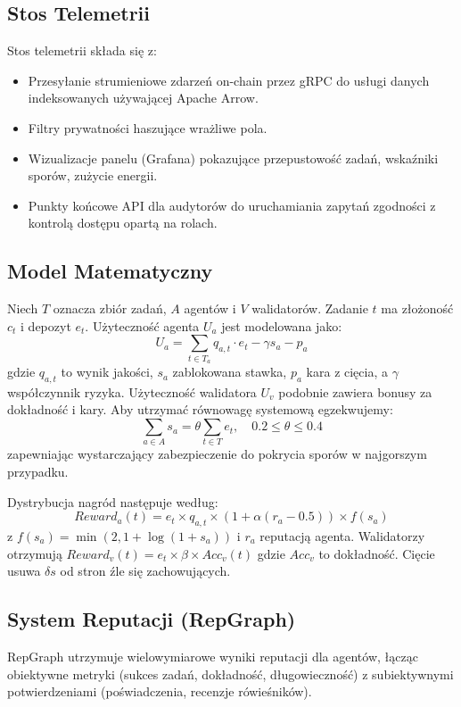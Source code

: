 \documentclass[11pt]{article}
\begin{document}
\subsection{Stos Telemetrii}
Stos telemetrii składa się z:
\begin{itemize}[noitemsep]
  \item Przesyłanie strumieniowe zdarzeń on-chain przez gRPC do usługi danych indeksowanych używającej Apache Arrow.
  \item Filtry prywatności haszujące wrażliwe pola.
  \item Wizualizacje panelu (Grafana) pokazujące przepustowość zadań, wskaźniki sporów, zużycie energii.
  \item Punkty końcowe API dla audytorów do uruchamiania zapytań zgodności z kontrolą dostępu opartą na rolach.
\end{itemize}

\subsection{Model Matematyczny}
Niech $T$ oznacza zbiór zadań, $A$ agentów i $V$ walidatorów. Zadanie $t$ ma złożoność $c_t$ i depozyt $e_t$. Użyteczność agenta $U_a$ jest modelowana jako:
\begin{equation}
U_a = \sum_{t \in T_a} q_{a,t}\cdot e_t - \gamma s_a - p_a\label{eq:agent-utility}
\end{equation}
gdzie $q_{a,t}$ to wynik jakości, $s_a$ zablokowana stawka, $p_a$ kara z cięcia, a $\gamma$ współczynnik ryzyka. Użyteczność walidatora $U_v$ podobnie zawiera bonusy za dokładność i kary. Aby utrzymać równowagę systemową egzekwujemy:
\begin{equation}
\sum_{a \in A} s_a = \theta \sum_{t \in T} e_t,\quad 0.2 \leq \theta \leq 0.4
\end{equation}
zapewniając wystarczający zabezpieczenie do pokrycia sporów w najgorszym przypadku.

Dystrybucja nagród następuje według:
\begin{equation}
Reward_a(t) = e_t \times q_{a,t} \times \left(1 + \alpha (r_a - 0.5)\right) \times f(s_a)
\end{equation}
z $f(s_a) = \min(2, 1 + \log(1+s_a))$ i $r_a$ reputacją agenta. Walidatorzy otrzymują $Reward_v(t) = e_t \times \beta \times Acc_v(t)$ gdzie $Acc_v$ to dokładność. Cięcie usuwa $\delta s$ od stron źle się zachowujących.

\subsection{System Reputacji (RepGraph)}
\label{sec:reputation}
RepGraph utrzymuje wielowymiarowe wyniki reputacji dla agentów, łącząc obiektywne metryki (sukces zadań, dokładność, długowieczność) z subiektywnymi potwierdzeniami (poświadczenia, recenzje rówieśników).
\end{document}
